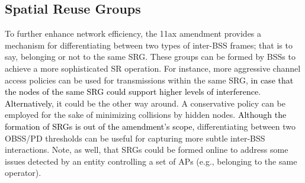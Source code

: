 \documentclass{ieeeaccess}
\begin{document}
\subsection{Spatial Reuse Groups}
\label{section:srg}
To further enhance network efficiency, the 11ax amendment provides a mechanism for differentiating between two types of inter-BSS frames; that is to say, belonging or not to the same SRG. These groups can be formed by BSSs to achieve a more sophisticated SR operation. For instance, more aggressive channel access policies can be used for transmissions within the same SRG, \textcolor{black}{in case that the nodes of the same SRG could support higher levels of interference}. \textcolor{black}{Alternatively}, it could be the other way around. A conservative policy can be employed for the sake of minimizing collisions by hidden nodes. \textcolor{black}{Although the formation of SRGs is out of the amendment's scope,} differentiating between two OBSS/PD thresholds can be useful for capturing more subtle inter-BSS interactions. Note, as well, that SRGs could be formed online to address some issues detected by an entity controlling a set of APs (e.g., belonging to the same operator).
\end{document}
